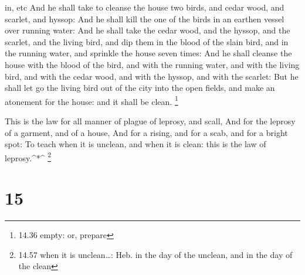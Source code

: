 in, etc  And he shall take to cleanse the house two birds,
and cedar wood, and scarlet, and hyssop:  And he shall kill
the one of the birds in an earthen vessel over running water:
 And he shall take the cedar wood, and the hyssop, and the
scarlet, and the living bird, and dip them in the blood of the slain
bird, and in the running water, and sprinkle the house seven times:
 And he shall cleanse the house with the blood of the bird,
and with the running water, and with the living bird, and with the cedar
wood, and with the hyssop, and with the scarlet:  But he
shall let go the living bird out of the city into the open fields, and
make an atonement for the house: and it shall be clean. \footnote{14.36
  empty: or, prepare}

 This is the law for all manner of plague of leprosy, and
scall,  And for the leprosy of a garment, and of a house,
 And for a rising, and for a scab, and for a bright spot:
 To teach when it is unclean, and when it is clean: this is
the law of leprosy.\^{}*\^{} \footnote{14.57 when it is unclean\ldots:
  Heb. in the day of the unclean, and in the day of the clean}

\hypertarget{section-14}{%
\section{15}\label{section-14}}

